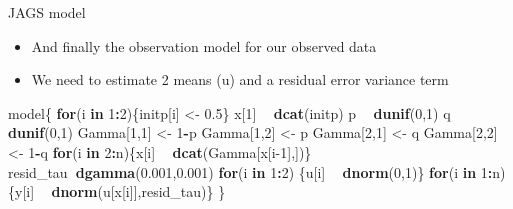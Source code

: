 \documentclass[
  ignorenonframetext,
]{beamer}
\newenvironment{Shaded}{\begin{snugshade}}{\end{snugshade}}
\newcommand{\ControlFlowTok}[1]{\textcolor[rgb]{0.13,0.29,0.53}{\textbf{#1}}}
\newcommand{\DecValTok}[1]{\textcolor[rgb]{0.00,0.00,0.81}{#1}}
\newcommand{\FloatTok}[1]{\textcolor[rgb]{0.00,0.00,0.81}{#1}}
\newcommand{\KeywordTok}[1]{\textcolor[rgb]{0.13,0.29,0.53}{\textbf{#1}}}
\newcommand{\NormalTok}[1]{#1}
\newcommand{\OperatorTok}[1]{\textcolor[rgb]{0.81,0.36,0.00}{\textbf{#1}}}
\newcommand{\StringTok}[1]{\textcolor[rgb]{0.31,0.60,0.02}{#1}}
\providecommand{\tightlist}{%
  \setlength{\itemsep}{0pt}\setlength{\parskip}{0pt}}
\begin{document}
\begin{frame}[fragile]{JAGS model}
\protect\hypertarget{jags-model-4}{}

\begin{itemize}
\tightlist
\item
  And finally the observation model for our observed data
\item
  We need to estimate 2 means (u) and a residual error variance term
\end{itemize}

\begin{Shaded}
\begin{Highlighting}[]
\NormalTok{model\{}
\ControlFlowTok{for}\NormalTok{(i }\ControlFlowTok{in} \DecValTok{1}\OperatorTok{:}\DecValTok{2}\NormalTok{)\{initp[i] <-}\StringTok{ }\FloatTok{0.5}\NormalTok{\}}
\NormalTok{x[}\DecValTok{1}\NormalTok{] }\OperatorTok{~}\StringTok{ }\KeywordTok{dcat}\NormalTok{(initp)}
\NormalTok{p }\OperatorTok{~}\StringTok{ }\KeywordTok{dunif}\NormalTok{(}\DecValTok{0}\NormalTok{,}\DecValTok{1}\NormalTok{)}
\NormalTok{q }\OperatorTok{~}\StringTok{ }\KeywordTok{dunif}\NormalTok{(}\DecValTok{0}\NormalTok{,}\DecValTok{1}\NormalTok{)}
\NormalTok{Gamma[}\DecValTok{1}\NormalTok{,}\DecValTok{1}\NormalTok{] <-}\StringTok{ }\DecValTok{1}\OperatorTok{-}\NormalTok{p}
\NormalTok{Gamma[}\DecValTok{1}\NormalTok{,}\DecValTok{2}\NormalTok{] <-}\StringTok{ }\NormalTok{p}
\NormalTok{Gamma[}\DecValTok{2}\NormalTok{,}\DecValTok{1}\NormalTok{] <-}\StringTok{ }\NormalTok{q}
\NormalTok{Gamma[}\DecValTok{2}\NormalTok{,}\DecValTok{2}\NormalTok{] <-}\StringTok{ }\DecValTok{1}\OperatorTok{-}\NormalTok{q}
\ControlFlowTok{for}\NormalTok{(i }\ControlFlowTok{in} \DecValTok{2}\OperatorTok{:}\NormalTok{n)\{x[i] }\OperatorTok{~}\StringTok{ }\KeywordTok{dcat}\NormalTok{(Gamma[x[i}\DecValTok{-1}\NormalTok{],])\}}
\NormalTok{resid_tau}\OperatorTok{~}\KeywordTok{dgamma}\NormalTok{(}\FloatTok{0.001}\NormalTok{,}\FloatTok{0.001}\NormalTok{)}
\ControlFlowTok{for}\NormalTok{(i }\ControlFlowTok{in} \DecValTok{1}\OperatorTok{:}\DecValTok{2}\NormalTok{) \{u[i] }\OperatorTok{~}\StringTok{ }\KeywordTok{dnorm}\NormalTok{(}\DecValTok{0}\NormalTok{,}\DecValTok{1}\NormalTok{)\}}
\ControlFlowTok{for}\NormalTok{(i }\ControlFlowTok{in} \DecValTok{1}\OperatorTok{:}\NormalTok{n)\{y[i] }\OperatorTok{~}\StringTok{ }\KeywordTok{dnorm}\NormalTok{(u[x[i]],resid_tau)\}}
\NormalTok{\}}
\end{Highlighting}
\end{Shaded}

\end{frame}
\end{document}
